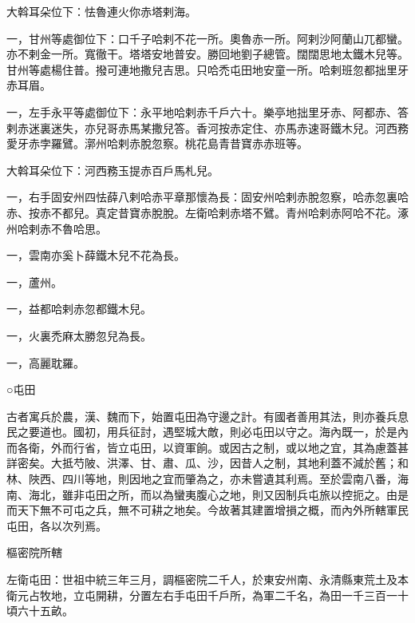 \begin{pinyinscope}
 大斡耳朵位下：怯魯連火你赤塔剌海。



 一，甘州等處御位下：口千子哈剌不花一所。奧魯赤一所。阿剌沙阿蘭山兀都蠻。亦不剌金一所。寬徹干。塔塔安地普安。勝回地劉子總管。闊闊思地太鐵木兒等。甘州等處楊住普。撥可連地撒兒吉思。只哈禿屯田地安童一所。哈剌班忽都拙里牙赤耳眉。



 一，左手永平等處御位下：永平地哈剌赤千戶六十。樂亭地拙里牙赤、阿都赤、答剌赤迷裏迷失，亦兒哥赤馬某撒兒答。香河按赤定住、亦馬赤速哥鐵木兒。河西務愛牙赤孛羅鷿。漷州哈剌赤脫忽察。桃花島青昔寶赤赤班等。



 大斡耳朵位下：河西務玉提赤百戶馬札兒。



 一，右手固安州四怯薛八剌哈赤平章那懷為長：固安州哈剌赤脫忽察，哈赤忽裏哈赤、按赤不都兒。真定昔寶赤脫脫。左衛哈剌赤塔不鷿。青州哈剌赤阿哈不花。涿州哈剌赤不魯哈思。



 一，雲南亦奚卜薛鐵木兒不花為長。



 一，蘆州。



 一，益都哈剌赤忽都鐵木兒。



 一，火裏禿麻太勝忽兒為長。



 一，高麗耽羅。



 ○屯田



 古者寓兵於農，漢、魏而下，始置屯田為守邊之計。有國者善用其法，則亦養兵息民之要道也。國初，用兵征討，遇堅城大敵，則必屯田以守之。海內既一，於是內而各衛，外而行省，皆立屯田，以資軍餉。或因古之制，或以地之宜，其為慮蓋甚詳密矣。大抵芍陂、洪澤、甘、肅、瓜、沙，因昔人之制，其地利蓋不減於舊；和林、陜西、四川等地，則因地之宜而肇為之，亦未嘗遺其利焉。至於雲南八番，海南、海北，雖非屯田之所，而以為蠻夷腹心之地，則又因制兵屯旅以控扼之。由是而天下無不可屯之兵，無不可耕之地矣。今故著其建置增損之概，而內外所轄軍民屯田，各以次列焉。



 樞密院所轄



 左衛屯田：世祖中統三年三月，調樞密院二千人，於東安州南、永清縣東荒土及本衛元占牧地，立屯開耕，分置左右手屯田千戶所，為軍二千名，為田一千三百一十頃六十五畝。




\end{pinyinscope}
